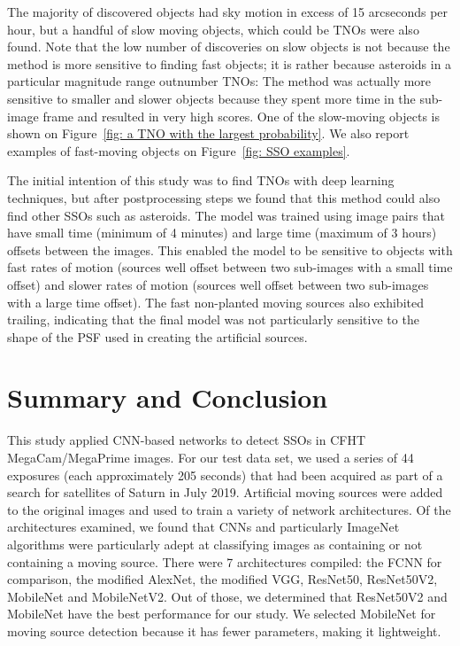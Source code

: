 The majority of discovered objects had sky motion in excess of 15 arcseconds per hour, but a handful of slow moving objects, which could be TNOs were also found.
Note that the low number of discoveries on slow objects is not because the method is more sensitive to finding fast objects; it is rather because asteroids in a particular magnitude range outnumber TNOs: The method was actually more sensitive to smaller and slower objects because they spent more time in the sub-image frame and resulted in very high scores.
One of the slow-moving objects is shown on Figure~\ref{fig: a TNO with the largest probability}.
We also report examples of fast-moving objects on Figure~\ref{fig: SSO examples}.

The initial intention of this study was to find TNOs with deep learning techniques, but after postprocessing steps we found that this method could also find other SSOs such as asteroids.
The model was trained using image pairs that have small time (minimum of 4 minutes) and large time (maximum of 3 hours) offsets between the images.
This enabled the model to be sensitive to objects with fast rates of motion (sources well offset between two sub-images with a small time offset) and slower rates of motion (sources well offset between two sub-images with a large time offset).
The fast non-planted moving sources also exhibited trailing, indicating that the final model was not particularly sensitive to the shape of the PSF used in creating the artificial sources.

\section{Summary and Conclusion}
This study applied CNN-based networks to detect SSOs in CFHT MegaCam/MegaPrime images.
For our test data set, we used a series of 44 exposures (each approximately 205 seconds) that had been acquired as part of a search for satellites of Saturn in July 2019.
Artificial moving sources were added to the original images and used to train a variety of network architectures.
Of the architectures examined, we found that CNNs and particularly ImageNet algorithms were particularly adept at classifying images as containing or not containing a moving source.
There were 7 architectures compiled: the FCNN for comparison, the modified AlexNet, the modified VGG, ResNet50, ResNet50V2, MobileNet and MobileNetV2.
Out of those, we determined that ResNet50V2 and MobileNet have the best performance for our study.
We selected MobileNet for moving source detection because it has fewer parameters, making it lightweight.

